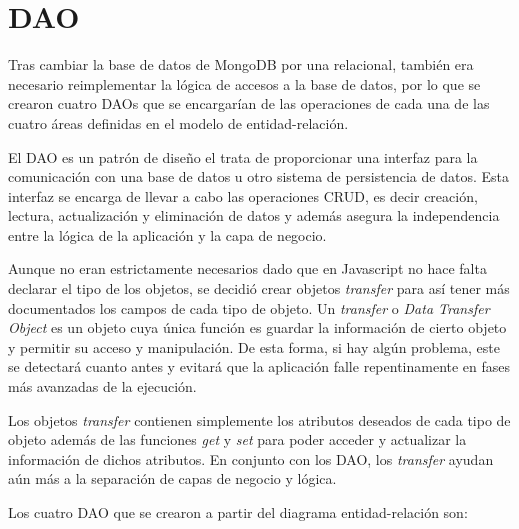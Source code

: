 \documentclass[11pt]{book}
\begin{document}
	
	\chapter{DAO}\label{cap:daos}
	
	Tras cambiar la base de datos de MongoDB por una relacional, también era necesario reimplementar la lógica de accesos a la base de datos, por lo que se crearon cuatro DAOs que se encargarían de las operaciones de cada una de las cuatro áreas definidas en el modelo de entidad-relación.
	
	El DAO es un patrón de diseño el trata de proporcionar una interfaz para la comunicación con una base de datos u otro sistema de persistencia de datos. Esta interfaz se encarga de llevar a cabo las operaciones CRUD, es decir creación, lectura, actualización y eliminación de datos y además asegura la independencia entre la lógica de la aplicación y la capa de negocio.
	
	Aunque no eran estrictamente necesarios dado que en Javascript no hace falta declarar el tipo de los objetos, se decidió crear objetos \emph{transfer} para así tener más documentados los campos de cada tipo de objeto.
	Un \emph{transfer} o \emph{Data Transfer Object} es un objeto cuya única función es guardar la información de cierto objeto y permitir su acceso y manipulación.
	De esta forma, si hay algún problema, este se detectará cuanto antes y evitará que la aplicación falle repentinamente en fases más avanzadas de la ejecución.
	
	Los objetos \emph{transfer} contienen simplemente los atributos deseados de cada tipo de objeto además de las funciones \emph{get} y \emph{set} para poder acceder y actualizar la información de dichos atributos.
	En conjunto con los DAO, los \emph{transfer} ayudan aún más a la separación de capas de negocio y lógica.
	
	Los cuatro DAO que se crearon a partir del diagrama entidad-relación son:
	
\end{document}
